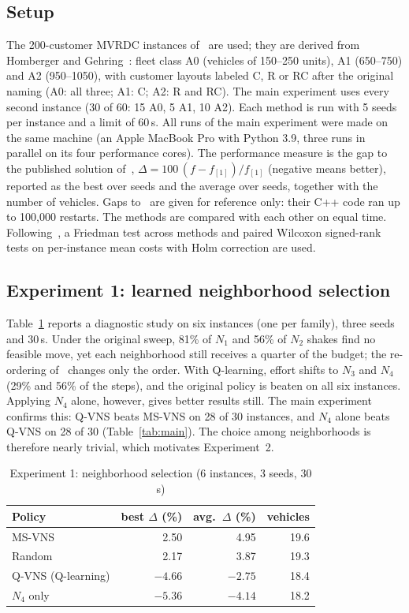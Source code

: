 \documentclass[conference]{IEEEtran}
\begin{document}
\subsection{Setup}
The 200-customer MVRDC instances of~\cite{masmoudi2026} are used; they are derived from Homberger and Gehring~\cite{homberger1999}: fleet class A0 (vehicles of 150--250 units), A1 (650--750) and A2 (950--1050), with customer layouts labeled C, R or RC after the original naming (A0: all three; A1: C; A2: R and RC). The main experiment uses every second instance (30 of 60: 15 A0, 5 A1, 10 A2). Each method is run with 5 seeds per instance and a limit of 60\,s. All runs of the main experiment were made on the same machine (an Apple MacBook Pro with Python 3.9, three runs in parallel on its four performance cores). The performance measure is the gap to the published solution of~\cite{masmoudi2026}, $\Delta=100\,(f-f_{[1]})/f_{[1]}$ (negative means better), reported as the best over seeds and the average over seeds, together with the number of vehicles. Gaps to~\cite{masmoudi2026} are given for reference only: their C++ code ran up to 100{,}000 restarts. The methods are compared with each other on equal time. Following~\cite{demsar2006}, a Friedman test across methods and paired Wilcoxon signed-rank tests on per-instance mean costs with Holm correction are used.



\subsection{Experiment 1: learned neighborhood selection}
Table~\ref{tab:exp1} reports a diagnostic study on six instances (one per family), three seeds and 30\,s. Under the original sweep, 81\% of $N_1$ and 56\% of $N_2$ shakes find no feasible move, yet each neighborhood still receives a quarter of the budget; the re-ordering of~\cite{masmoudi2026} changes only the order. With Q-learning, effort shifts to $N_3$ and $N_4$ (29\% and 56\% of the steps), and the original policy is beaten on all six instances. Applying $N_4$ alone, however, gives better results still. The main experiment confirms this: Q-VNS beats MS-VNS on 28 of 30 instances, and $N_4$ alone beats Q-VNS on 28 of 30 (Table~\ref{tab:main}). The choice among neighborhoods is therefore nearly trivial, which motivates Experiment~2.

\begin{table}[t]
\caption{Experiment 1: neighborhood selection (6 instances, 3 seeds, 30 s)}\label{tab:exp1}
\centering
\begin{tabular}{lrrr}
\toprule
Policy & best $\Delta$ (\%) & avg.\ $\Delta$ (\%) & vehicles \\
\midrule
MS-VNS~\cite{masmoudi2026} & 2.50 & 4.95 & 19.6 \\
Random & 2.17 & 3.87 & 19.3 \\
Q-VNS (Q-learning) & $-4.66$ & $-2.75$ & 18.4 \\
$N_4$ only & $-5.36$ & $-4.14$ & 18.2 \\
\bottomrule
\end{tabular}
\end{table}
\end{document}

